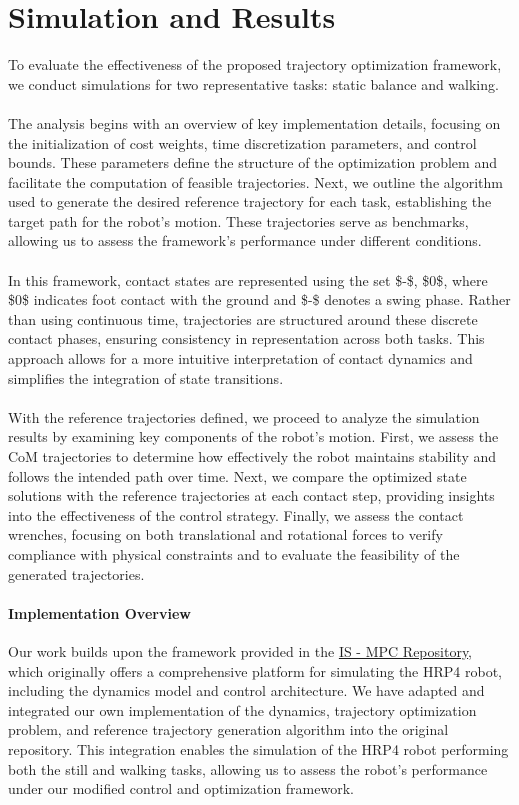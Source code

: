 \documentclass[main.tex]{subfiles}
\begin{document}
\begin{sloppypar}
\section{Simulation and Results}
\label{sec:newsimulation}
To evaluate the effectiveness of the proposed trajectory optimization framework, we conduct simulations for two representative tasks: static balance and walking. \\
\\
The analysis begins with an overview of key implementation details, focusing on the initialization of cost weights, time discretization parameters, and control bounds. These parameters define the structure of the optimization problem and facilitate the computation of feasible trajectories. Next, we outline the algorithm used to generate the desired reference trajectory for each task, establishing the target path for the robot’s motion. These trajectories serve as benchmarks, allowing us to assess the framework’s performance under different conditions.\\
\\
In this framework, contact states are represented using the set {\$-\$, \$0\$}, where \$0\$ indicates foot contact with the ground and \$-\$ denotes a swing phase. Rather than using continuous time, trajectories are structured around these discrete contact phases, ensuring consistency in representation across both tasks. This approach allows for a more intuitive interpretation of contact dynamics and simplifies the integration of state transitions. \\
\\
With the reference trajectories defined, we proceed to analyze the simulation results by examining key components of the robot’s motion. First, we assess the CoM trajectories to determine how effectively the robot maintains stability and follows the intended path over time. Next, we compare the optimized state solutions with the reference trajectories at each contact step, providing insights into the effectiveness of the control strategy. Finally, we assess the contact wrenches, focusing on both translational and rotational forces to verify compliance with physical constraints and to evaluate the feasibility of the generated trajectories. \\
\paragraph{Implementation Overview}
Our work builds upon the framework provided in the \href{[https://github.com/DIAG-Robotics-Lab/ismpc}{IS - MPC Repository}, which originally offers a comprehensive platform for simulating the HRP4 robot, including the dynamics model and control architecture. We have adapted and integrated our own implementation of the dynamics, trajectory optimization problem, and reference trajectory generation algorithm into the original repository. This integration enables the simulation of the HRP4 robot performing both the still and walking tasks, allowing us to assess the robot’s performance under our modified control and optimization framework.

\end{sloppypar}
\end{document}
